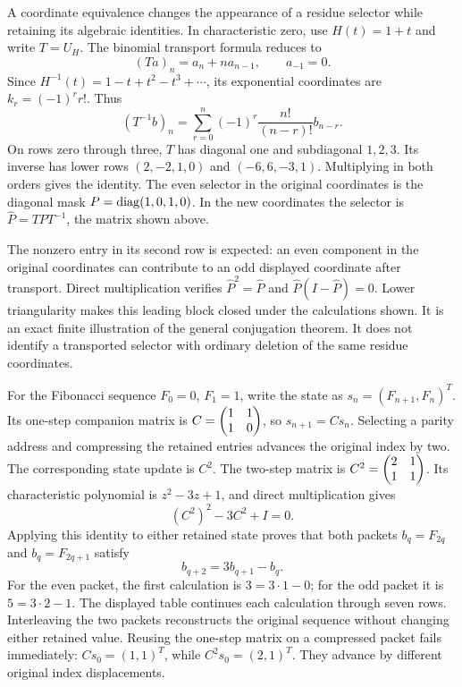 A coordinate equivalence changes the appearance of a residue selector while retaining its algebraic identities. In characteristic zero, use $H(t)=1+t$ and write $T=U_H$. The binomial transport formula reduces to
\[
 (Ta)_n=a_n+na_{n-1},\qquad a_{-1}=0.
\]
Since $H^{-1}(t)=1-t+t^2-t^3+\cdots$, its exponential coordinates are $k_r=(-1)^r r!$. Thus
\[
 (T^{-1}b)_n=\sum_{r=0}^n(-1)^r\frac{n!}{(n-r)!}b_{n-r}.
\]
On rows zero through three, $T$ has diagonal one and subdiagonal $1,2,3$. Its inverse has lower rows $(2,-2,1,0)$ and $(-6,6,-3,1)$. Multiplying in both orders gives the identity. The even selector in the original coordinates is the diagonal mask $P=\operatorname{diag}(1,0,1,0)$. In the new coordinates the selector is $\widehat P=TPT^{-1}$, the matrix shown above.

The nonzero entry in its second row is expected: an even component in the original coordinates can contribute to an odd displayed coordinate after transport. Direct multiplication verifies $\widehat P^2=\widehat P$ and $\widehat P(I-\widehat P)=0$.
Lower triangularity makes this leading block closed under the calculations shown. It is an exact finite illustration of the general conjugation theorem. It does not identify a transported selector with ordinary deletion of the same residue coordinates.

For the Fibonacci sequence $F_0=0$, $F_1=1$, write the state as $s_n=(F_{n+1},F_n)^T$. Its one-step companion matrix is $C=\begin{pmatrix}1&1\\1&0\end{pmatrix}$, so $s_{n+1}=Cs_n$. Selecting a parity address and compressing the retained entries advances the original index by two. The corresponding state update is $C^2$.
The two-step matrix is $C^2=\begin{pmatrix}2&1\\1&1\end{pmatrix}$. Its characteristic polynomial is $z^2-3z+1$, and direct multiplication gives
\[
 (C^2)^2-3C^2+I=0.
\]
Applying this identity to either retained state proves that both packets $b_q=F_{2q}$ and $b_q=F_{2q+1}$ satisfy
\[
 b_{q+2}=3b_{q+1}-b_q.
\]
For the even packet, the first calculation is $3=3\cdot1-0$; for the odd packet it is $5=3\cdot2-1$. The displayed table continues each calculation through seven rows.
Interleaving the two packets reconstructs the original sequence without changing either retained value. Reusing the one-step matrix on a compressed packet fails immediately: $Cs_0=(1,1)^T$, while $C^2s_0=(2,1)^T$. They advance by different original index displacements.


